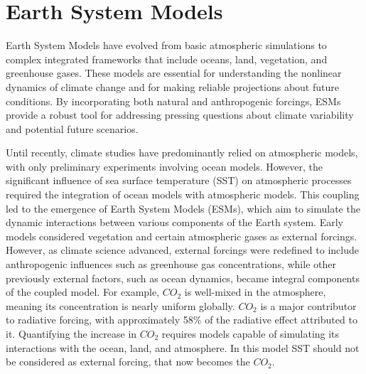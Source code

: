 \chapter{Earth System Models}\label{chapter7}
Earth System Models have evolved from basic atmospheric simulations to complex integrated frameworks that include oceans, land, vegetation, and greenhouse gases. These models are essential for understanding the nonlinear dynamics of climate change and for making reliable projections about future conditions. By incorporating both natural and anthropogenic forcings, ESMs provide a robust tool for addressing pressing questions about climate variability and potential future scenarios.

Until recently, climate studies have predominantly relied on atmospheric models, with only preliminary experiments involving ocean models. However, the significant influence of sea surface temperature (SST) on atmospheric processes required the integration of ocean models with atmospheric models. This coupling led to the emergence of Earth System Models (ESMs), which aim to simulate the dynamic interactions between various components of the Earth system. Early models considered vegetation and certain atmospheric gases as external forcings. However, as climate science advanced, external forcings were redefined to include anthropogenic influences such as greenhouse gas concentrations, while other previously external factors, such as ocean dynamics, became integral components of the coupled model.
For example, $CO_2$ is well-mixed in the atmosphere, meaning its concentration is nearly uniform globally. $CO_2$ is a major contributor to radiative forcing, with approximately 58\% of the radiative effect attributed to it.
Quantifying the increase in $CO_2$ requires models capable of simulating its interactions with the ocean, land, and atmosphere. In this model SST should not be considered as external forcing, that now becomes the $CO_2$.

